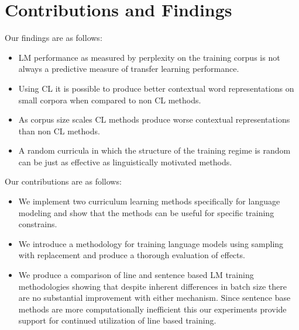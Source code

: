 \section{Contributions and Findings}
\label{chap:intro:sec:contributions}
Our findings are as follows:
\begin{itemize}
  \item LM performance as measured by perplexity on the training corpus is not always a predictive measure of transfer learning performance.
  \item Using CL it is possible to produce better contextual word representations on small corpora when compared to non CL methods. 
  \item As corpus size scales CL methods produce worse contextual representations than non CL methods.
  \item A random curricula in which the structure of the training regime is random can be just as effective as linguistically motivated methods.
\end{itemize}
Our contributions are as follows:
\begin{itemize}
    \item We implement two curriculum learning methods specifically for language modeling and show that the methods can be useful for specific training constrains.
    \item We introduce a methodology for training language models using sampling with replacement and produce a thorough evaluation of effects.
    \item We produce a comparison of line and sentence based LM training methodologies showing that despite inherent differences in batch size there are no substantial improvement with either mechanism. Since sentence base methods are more computationally inefficient this our experiments provide support for continued utilization of line based training.
\end{itemize}
